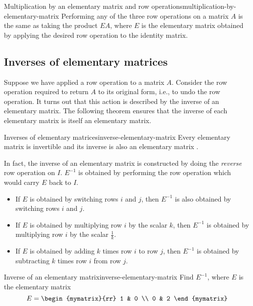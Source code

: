 \begin{theorem}{Multiplication by an elementary matrix and row operations}{multiplication-by-elementary-matrix}
  Performing any of the three row operations on a matrix $A$ is the
  same as taking the product $EA$, where $E$ is the elementary matrix
  obtained by applying the desired row operation to the identity
  matrix.
\end{theorem}

\subsection{Inverses of elementary matrices}

Suppose we have applied a row operation to a matrix $A$. Consider the
row operation required to return $A$ to its original form, i.e., to
undo the row operation. It turns out that this action is described by
the inverse of an elementary matrix. The following theorem ensures
that the inverse of each elementary matrix is itself an elementary
matrix.

\begin{theorem}{Inverses of elementary matrices}{inverse-elementary-matrix}
  Every elementary matrix is invertible and its inverse is also an
  elementary matrix%
  .
\end{theorem}

In fact, the inverse of an elementary matrix is constructed by doing
the {\em reverse }row operation on $I$. $E^{-1}$ is obtained by
performing the row operation which would carry $E$ back to $I$.

\begin{itemize}
\item If $E$ is obtained by switching rows $i$ and $j$, then $E^{-1}$
  is also obtained by switching rows $i$ and $j$.
\item If $E$ is obtained by multiplying row $i$ by the scalar $k$,
  then $E^{-1}$ is obtained by multiplying row $i$ by the scalar
  $\frac{1}{k}$.
\item If $E$ is obtained by adding $k$ times row $i$ to row $j$, then
  $E^{-1}$ is obtained by subtracting $k$ times row $i$ from row $j$.
\end{itemize}

\begin{example}{Inverse of an elementary matrix}{inverse-elementary-matrix}
  Find $E^{-1}$, where $E$ is the elementary matrix
  \begin{equation*}
    E
    =
    \begin{mymatrix}{rr}
      1 & 0 \\
      0 & 2
    \end{mymatrix}
  \end{equation*}
\end{example}

